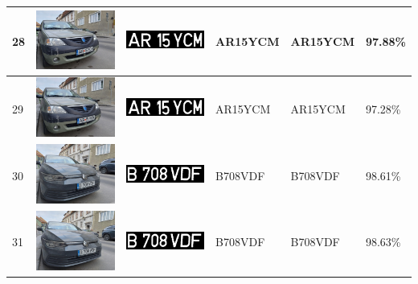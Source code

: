 \documentclass[a4paper,12pt]{report}
\begin{document}
\begin{longtable}{| m{0.6cm} | m{3cm} | m{3cm} | m{1.8cm} | m{1.8cm} | m{1.8cm} |}
    28  & \includegraphics[width=3cm,keepaspectratio]{dataset/15_s1.jpg}  & \includegraphics[width=3cm,keepaspectratio]{segmentari/28.jpg}  & AR15YCM             & AR15YCM              & 97.88\%    \\ \hline
    29  & \includegraphics[width=3cm,keepaspectratio]{dataset/15_s2.jpg}  & \includegraphics[width=3cm,keepaspectratio]{segmentari/29.jpg}  & AR15YCM             & AR15YCM              & 97.28\%    \\ \hline
    30  & \includegraphics[width=3cm,keepaspectratio]{dataset/16_s1.jpg}  & \includegraphics[width=3cm,keepaspectratio]{segmentari/30.jpg}  & B708VDF             & B708VDF              & 98.61\%    \\ \hline
    31  & \includegraphics[width=3cm,keepaspectratio]{dataset/16_s2.jpg}  & \includegraphics[width=3cm,keepaspectratio]{segmentari/31.jpg}  & B708VDF             & B708VDF              & 98.63\%    \\ \hline

\end{longtable}
\end{document}
